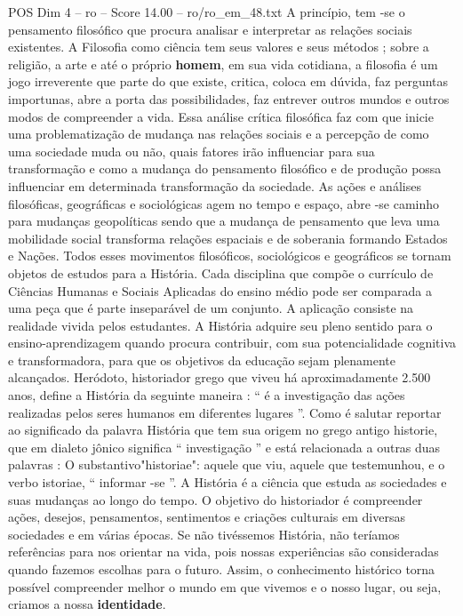 \begin{textsample}{POS Dim 4 – ro – Score 14.00 – ro/ro\_em\_48.txt}
A princípio, tem -se o pensamento filosófico que procura analisar e interpretar as relações sociais existentes.
A Filosofia como ciência tem seus valores e seus métodos ; sobre a religião, a arte e até o próprio \textbf{homem}, em sua vida cotidiana, a filosofia é um jogo irreverente que parte do que existe, critica, coloca em dúvida, faz perguntas importunas, abre a porta das possibilidades, faz entrever outros mundos e outros modos de compreender a vida.
Essa análise crítica filosófica faz com que inicie uma problematização de mudança nas relações sociais e a percepção de como uma sociedade muda ou não, quais fatores irão influenciar para sua transformação e como a mudança do pensamento filosófico e de produção possa influenciar em determinada transformação da sociedade.
As ações e análises filosóficas, geográficas e sociológicas agem no tempo e espaço, abre -se caminho para mudanças geopolíticas sendo que a mudança de pensamento que leva uma mobilidade social transforma relações espaciais e de soberania formando Estados e Nações.
Todos esses movimentos filosóficos, sociológicos e geográficos se tornam objetos de estudos para a História.
Cada disciplina que compõe o currículo de Ciências Humanas e Sociais Aplicadas do ensino médio pode ser comparada a uma peça que é parte inseparável de um conjunto.
A aplicação consiste na realidade vivida pelos estudantes.
A História adquire seu pleno sentido para o ensino-aprendizagem quando procura contribuir, com sua potencialidade cognitiva e transformadora, para que os objetivos da educação sejam plenamente alcançados.
Heródoto, historiador grego que viveu há aproximadamente 2.500 anos, define a História da seguinte maneira : “ é a investigação das ações realizadas pelos seres humanos em diferentes lugares ”.
Como é salutar reportar ao significado da palavra História que tem sua origem no grego antigo historie, que em dialeto jônico significa “ investigação ” e está relacionada a outras duas palavras : O substantivo"historiae": aquele que viu, aquele que testemunhou, e o verbo istoriae, “ informar -se ”.
A História é a ciência que estuda as sociedades e suas mudanças ao longo do tempo.
O objetivo do historiador é compreender ações, desejos, pensamentos, sentimentos e criações culturais em diversas sociedades e em várias épocas.
Se não tivéssemos História, não teríamos referências para nos orientar na vida, pois nossas experiências são consideradas quando fazemos escolhas para o futuro.
Assim, o conhecimento histórico torna possível compreender melhor o mundo em que vivemos e o nosso lugar, ou seja, criamos a nossa \textbf{identidade}.

\end{textsample}
